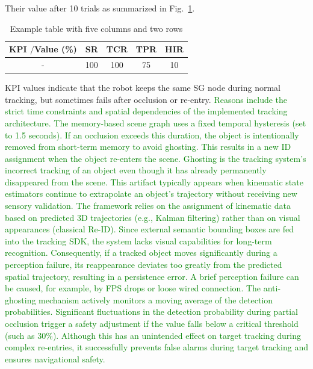 \documentclass[lettersize,journal]{IEEEtran}
\begin{document}
Their value after 10 trials as summarized in Fig.~\ref{tab:kpisr}.
\begin{table}[h]
	\centering
	\caption{Example table with five columns and two rows}
	\label{tab:kpisr}
	\begin{tabular}{|c | c|c|c|c|}
		\hline 
		KPI  $\slash$Value (\%) & SR  & TCR & TPR & HIR \\\hline
		\hline
		- & 100 & 100 & 75 & 10 \\
		\hline
	\end{tabular}
\end{table}
KPI values indicate that the robot  keeps the same SG node during normal tracking, but sometimes fails after occlusion or re-entry. \textcolor{green}{Reasons include the strict time constraints and spatial dependencies of the implemented tracking architecture. The memory-based scene graph uses a fixed temporal hysteresis (set to 1.5 seconds). If an occlusion exceeds this duration, the object is intentionally removed from short-term memory to avoid ghosting. This results in a new ID assignment when the object re-enters the scene. Ghosting is the tracking system’s incorrect tracking of an object even though it has already permanently disappeared from the scene. This artifact typically appears when kinematic state estimators continue to extrapolate an object's trajectory without receiving new sensory validation. The framework relies on the assignment of kinematic data based on predicted 3D trajectories (e.g., Kalman filtering) rather than on visual appearances (classical Re-ID). Since external semantic bounding boxes are fed into the tracking SDK, the system lacks visual capabilities for long-term recognition. Consequently, if a tracked object moves significantly during a perception failure, its reappearance deviates too greatly from the predicted spatial trajectory, resulting in a persistence error. A brief perception failure can be caused, for example, by FPS drops or loose wired connection. 
The anti-ghosting mechanism actively monitors a moving average of the detection probabilities. Significant fluctuations in the detection probability during partial occlusion trigger a safety adjustment if the value falls below a critical threshold (such as $30\%$). Although this has an unintended effect on target tracking during complex re-entries, it successfully prevents false alarms during target tracking and ensures navigational safety.}

\end{document}
